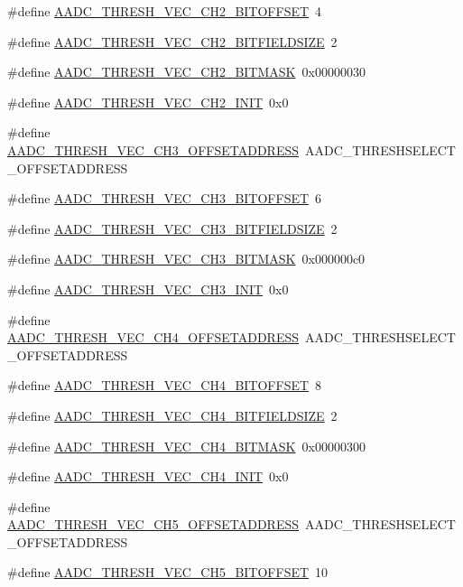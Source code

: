 \begin{DoxyCompactItemize}
\#define \hyperlink{a00543_a277cd67b7172f594d7e2ecb70414a008}{AADC\_\-THRESH\_\-VEC\_\-CH2\_\-BITOFFSET}~4
\item 
\#define \hyperlink{a00543_a2525a69ff95c38a7362a060aa384bbd7}{AADC\_\-THRESH\_\-VEC\_\-CH2\_\-BITFIELDSIZE}~2
\item 
\#define \hyperlink{a00543_ae672047a6501396c67dbbb8ba0bab30f}{AADC\_\-THRESH\_\-VEC\_\-CH2\_\-BITMASK}~0x00000030
\item 
\#define \hyperlink{a00543_a7a5980e64754feb12f2af8e8a6b48fc0}{AADC\_\-THRESH\_\-VEC\_\-CH2\_\-INIT}~0x0
\item 
\#define \hyperlink{a00543_a173103f1267638afe874338ab0620727}{AADC\_\-THRESH\_\-VEC\_\-CH3\_\-OFFSETADDRESS}~AADC\_\-THRESHSELECT\_\-OFFSETADDRESS
\item 
\#define \hyperlink{a00543_a8eabeab4d10603c3f65ee6cf13f54fd3}{AADC\_\-THRESH\_\-VEC\_\-CH3\_\-BITOFFSET}~6
\item 
\#define \hyperlink{a00543_aeb5b02a0f46e1c30366802d0a20acc88}{AADC\_\-THRESH\_\-VEC\_\-CH3\_\-BITFIELDSIZE}~2
\item 
\#define \hyperlink{a00543_a27374c1703689b868062cd4ae22a4015}{AADC\_\-THRESH\_\-VEC\_\-CH3\_\-BITMASK}~0x000000c0
\item 
\#define \hyperlink{a00543_adf0cec3157e6dfe096acb1a881894a5b}{AADC\_\-THRESH\_\-VEC\_\-CH3\_\-INIT}~0x0
\item 
\#define \hyperlink{a00543_abaaeddf6ac9abfde11f9ceb0ff2e4865}{AADC\_\-THRESH\_\-VEC\_\-CH4\_\-OFFSETADDRESS}~AADC\_\-THRESHSELECT\_\-OFFSETADDRESS
\item 
\#define \hyperlink{a00543_acba04ca1341e617f7361dcba67268c0d}{AADC\_\-THRESH\_\-VEC\_\-CH4\_\-BITOFFSET}~8
\item 
\#define \hyperlink{a00543_a8e9502895b1db66fb5733872a3859973}{AADC\_\-THRESH\_\-VEC\_\-CH4\_\-BITFIELDSIZE}~2
\item 
\#define \hyperlink{a00543_a884f462c780da53a93951cbc088e9c01}{AADC\_\-THRESH\_\-VEC\_\-CH4\_\-BITMASK}~0x00000300
\item 
\#define \hyperlink{a00543_a307a2548fcd17a330e226c8a1bde7279}{AADC\_\-THRESH\_\-VEC\_\-CH4\_\-INIT}~0x0
\item 
\#define \hyperlink{a00543_a9e3e92a53c36d7a24b60a25cf022d091}{AADC\_\-THRESH\_\-VEC\_\-CH5\_\-OFFSETADDRESS}~AADC\_\-THRESHSELECT\_\-OFFSETADDRESS
\item 
\#define \hyperlink{a00543_a615a6cd485e427db62160daac4e3f4ec}{AADC\_\-THRESH\_\-VEC\_\-CH5\_\-BITOFFSET}~10
\item 

\end{DoxyCompactItemize}
